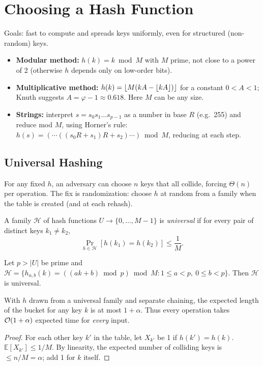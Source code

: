 \section{Choosing a Hash Function}

Goals: fast to compute and spreads keys uniformly, even for structured
(non-random) keys.
\begin{itemize}
  \item \textbf{Modular method:} $h(k) = k \bmod M$ with $M$ prime, not close to
        a power of 2 (otherwise $h$ depends only on low-order bits).
  \item \textbf{Multiplicative method:} $h(k) = \left\lfloor M (kA - \left\lfloor kA \right\rfloor) \right\rfloor$
        for a constant $0 < A < 1$; Knuth suggests $A = \varphi - 1 \approx 0.618$.
        Here $M$ can be any size.
  \item \textbf{Strings:} interpret $s = s_0 s_1 \ldots s_{p-1}$ as a number in
        base $R$ (e.g.\ 255) and reduce mod $M$, using Horner's rule:
        $h(s) = (\cdots((s_0 R + s_1) R + s_2)\cdots) \bmod M$, reducing at each step.
\end{itemize}

\subsection{Universal Hashing}

For any fixed $h$, an adversary can choose $n$ keys that all collide, forcing
$\Theta(n)$ per operation. The fix is randomization: choose $h$ at random from a
family when the table is created (and at each rehash).

\begin{definition}
A family $\mathcal H$ of hash functions $U \to \{0,\ldots,M-1\}$ is
\emph{universal} if for every pair of distinct keys $k_1 \ne k_2$,
\[
\Pr_{h \in \mathcal H}[h(k_1) = h(k_2)] \le \frac1M.
\]
\end{definition}

\begin{theorem}
Let $p > |U|$ be prime and $\mathcal H = \{h_{a,b}(k) = ((ak + b) \bmod p) \bmod M
: 1 \le a < p,\ 0 \le b < p\}$. Then $\mathcal H$ is universal.
\end{theorem}

\begin{theorem}
With $h$ drawn from a universal family and separate chaining, the expected
length of the bucket for any key $k$ is at most $1 + \alpha$. Thus every
operation takes $\mathcal{O}(1 + \alpha)$ expected time for \emph{every} input.
\end{theorem}
\begin{proof}
For each other key $k'$ in the table, let $X_{k'}$ be 1 if $h(k') = h(k)$.
$\mathbb E[X_{k'}] \le 1/M$. By linearity, the expected number of colliding keys
is $\le n/M = \alpha$; add 1 for $k$ itself.
\end{proof}

